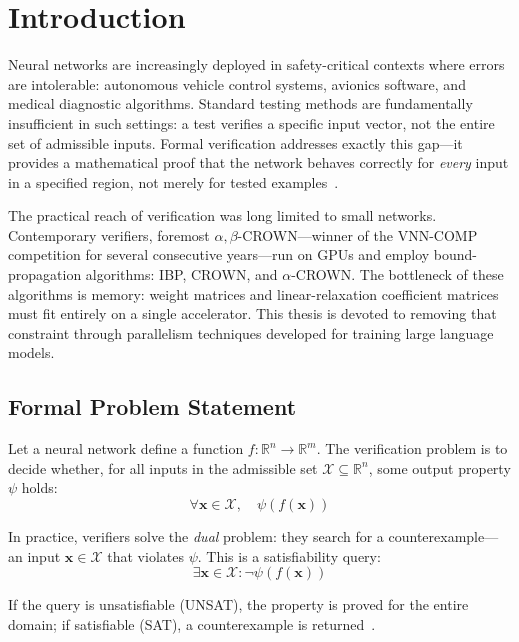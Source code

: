\section*{Introduction}

Neural networks are increasingly deployed in safety-critical contexts where
errors are intolerable: autonomous vehicle control systems, avionics software,
and medical diagnostic algorithms. Standard testing methods are fundamentally
insufficient in such settings: a test verifies a specific input vector, not
the entire set of admissible inputs. Formal verification addresses exactly this
gap---it provides a mathematical proof that the network behaves correctly for
\emph{every} input in a specified region, not merely for tested
examples~\cite{Guidotti2019Enhancing}.

The practical reach of verification was long limited to small networks.
Contemporary verifiers, foremost $\alpha,\beta$-CROWN---winner of the
VNN-COMP competition for several consecutive years---run on GPUs and employ
bound-propagation algorithms: IBP, CROWN, and $\alpha$-CROWN. The
bottleneck of these algorithms is memory: weight matrices and linear-relaxation
coefficient matrices must fit entirely on a single accelerator. This thesis is
devoted to removing that constraint through parallelism techniques developed for
training large language models.

\subsection*{Formal Problem Statement}

Let a neural network define a function $f: \mathbb{R}^n \to \mathbb{R}^m$.
The verification problem is to decide whether, for all inputs in the admissible
set $\mathcal{X} \subseteq \mathbb{R}^n$, some output property $\psi$ holds:
$$\forall \mathbf{x} \in \mathcal{X},\quad \psi(f(\mathbf{x}))$$

In practice, verifiers solve the \emph{dual} problem: they search for a
counterexample---an input $\mathbf{x} \in \mathcal{X}$ that violates $\psi$.
This is a satisfiability query:
$$\exists \mathbf{x} \in \mathcal{X} : \neg\psi(f(\mathbf{x}))$$

If the query is unsatisfiable (UNSAT), the property is proved for the entire
domain; if satisfiable (SAT), a counterexample is returned~\cite{marzari2025advancingneuralnetworkverification}.

